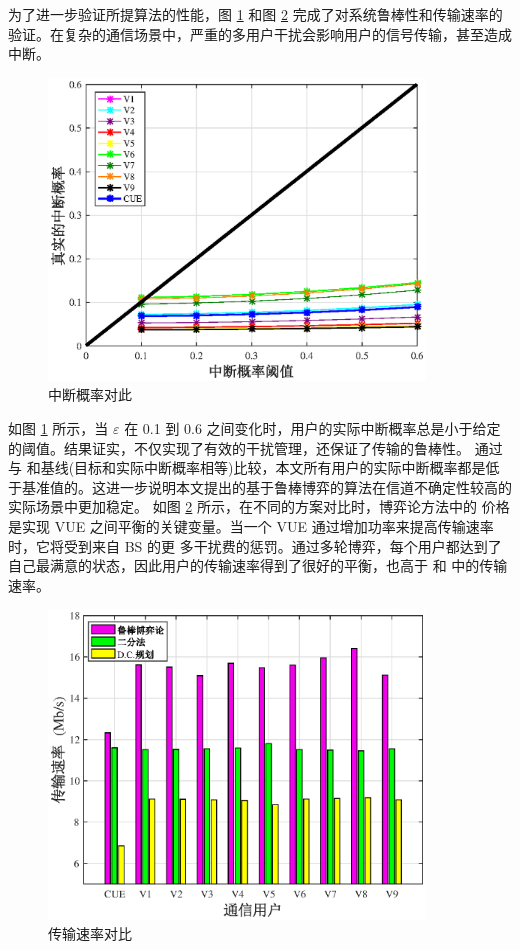 为了进一步验证所提算法的性能，图 \ref{中断概率对此} 和图 \ref{传输速率对比} 完成了对系统鲁棒性和传输速率的验证。在复杂的通信场景中，严重的多用户干扰会影响用户的信号传输，甚至造成中断。
\begin{figure}[H]
\centering
\includegraphics[width=10cm]{figures//chap2//中断概率.eps}
\caption{中断概率对此}
\label{中断概率对此}
\end{figure}

如图 \ref{中断概率对此} 所示，当 $\varepsilon$ 在 0.1 到 0.6 之间变化时，用户的实际中断概率总是小于给定的阈值。结果证实，不仅实现了有效的干扰管理，还保证了传输的鲁棒性。
通过与 \cite{PCID}和基线(目标和实际中断概率相等)比较，本文所有用户的实际中断概率都是低于基准值的。这进一步说明本文提出的基于鲁棒博弈的算法在信道不确定性较高的实际场景中更加稳定。
如图 \ref{传输速率对比} 所示，在不同的方案对比时，博弈论方法中的
价格是实现 VUE 之间平衡的关键变量。当一个 VUE 通过增加功率来提高传输速率时，它将受到来自 BS 的更
多干扰费的惩罚。通过多轮博弈，每个用户都达到了自己最满意的状态，因此用户的传输速率得到了很好的平衡，也高于 \cite{PCID}和 \cite{ACAR}中的传输速率。
\begin{figure}[H]
\centering
\includegraphics[width=10cm]{figures//chap2//传输速率对比.eps}
\caption{传输速率对比}
\label{传输速率对比}
\end{figure}

